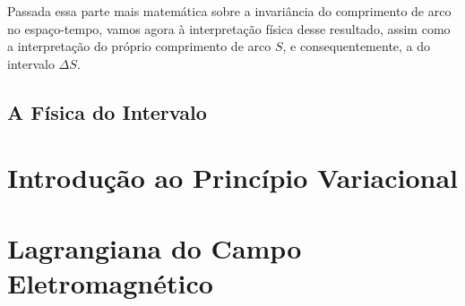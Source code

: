 \documentclass[12pt,a4paper]{article}
\begin{document}
Passada essa parte mais matemática sobre a invariância do comprimento de arco no espaço-tempo, vamos agora 
à interpretação física desse resultado, assim como a interpretação do próprio comprimento de arco $S$, e consequentemente,
a do intervalo $\Delta S$.
\subsection{A Física do Intervalo}
\section{Introdução ao Princípio Variacional}

\section{Lagrangiana do Campo Eletromagnético}

\newpage
\printbibliography
\end{document}
